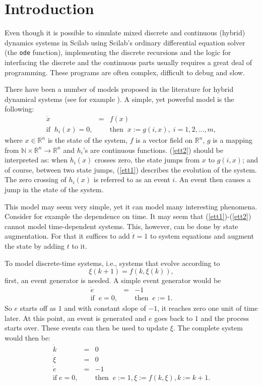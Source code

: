 \documentclass{book}
\begin{document}
\tableofcontents
\listoffigures
\listoftables

\chapter{Introduction}
Even though it is possible to simulate mixed discrete and
continuous (hybrid) dynamics systems in Scilab using Scilab's ordinary
differential equation solver (the {\tt ode}
function), implementing the discrete  recursions and the logic for
interfacing the discrete and the continuous parts usually
requires a great deal of programming. These programs are often
complex, difficult to debug and slow. 


There have been a number of models proposed in the literature for
hybrid dynamical systems (see for example \cite{Hybrid,mats}). 
A simple, yet powerful model is the following:
\begin{eqnarray}
\dot{x} &=& f(x) \label{ett1} \\
\mbox{if}\;\;h_i(x)=0,&&\mbox{then}\;\;x:=g(i,x) ,\;i=1,2,...,m, \label{ett2}
\end{eqnarray}
where $x\in \mathbb{R}^n$ is the state of the system, $f$ is a vector
field on $\mathbb{R}^n$, $g$ is a mapping from $\mathbb{N}\times \mathbb{R}^n
\rightarrow \mathbb{R}^n$ and $h_i$'s are continuous
functions. (\ref{ett2}) should be interpreted as: when $h_i(x)$ crosses
zero, the state jumps from $x$ to $g(i,x)$; and of course, between two
state jumps, (\ref{ett1}) describes the evolution of the system. The
zero crossing of $h_i(x)$ is referred to as an event $i$. An event
then causes a jump in the state of the system.

This model may seem very simple, yet it can model many interesting
phenomena. Consider for example the dependence on time. It may seem that
(\ref{ett1})-(\ref{ett2}) cannot model time-dependent systems. This,
however, can be done by state augmentation. For that it suffices to
add $\dot{t}=1$ to system equations and augment the state by adding $t$ to it. 

To model discrete-time systems, i.e., systems that evolve according to
\begin{equation}
\xi(k+1)=f(k,\xi(k)),
\end{equation}
first, an event generator is needed. A simple event generator would be
\begin{eqnarray}
\dot{e}&=&-1  \\ \label{ett3}
\mbox{if}\;\;e=0,&&\mbox{then}\;\;e:=1.
\end{eqnarray}
So $e$ starts off as $1$ and with constant slope
of $-1$, it reaches zero one unit of time later. At this point, an
event is generated and $e$ goes back to $1$ and the process starts
over. These events can then be used to update $\xi$. The complete
system would then be:
\begin{eqnarray}
\dot{k}&=&0 \\
\dot{\xi}&=&0 \\
\dot{e}&=&-1 \\
\mbox{if}\;e=0,&&\mbox{then}\;\;e:=1,\xi:=f(k,\xi),k:=k+1.
\end{eqnarray}
\end{document}
